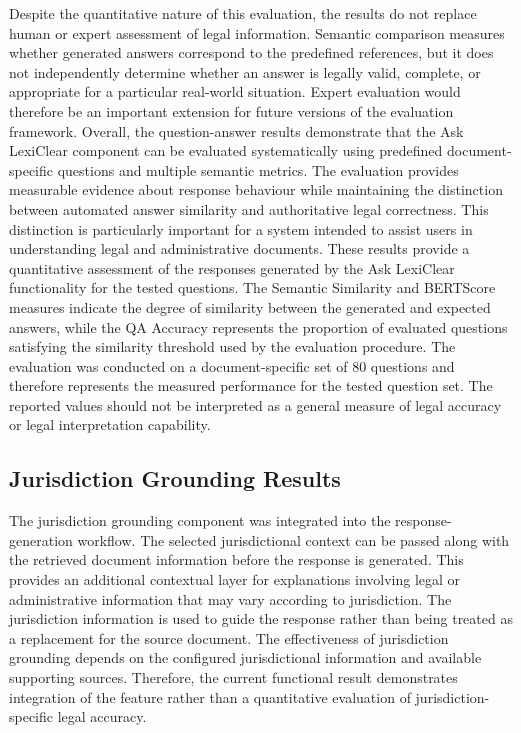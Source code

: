 \documentclass[12pt,a4paper,oneside]{report}
\begin{document}
Despite the quantitative nature of this evaluation, the results do not replace human or expert assessment of legal information. Semantic comparison measures whether generated answers correspond to the predefined references, but it does not independently determine whether an answer is legally valid, complete, or appropriate for a particular real-world situation. Expert evaluation would therefore be an important extension for future versions of the evaluation framework. Overall, the question-answer results demonstrate that the Ask LexiClear component can be evaluated systematically using predefined document-specific questions and multiple semantic metrics. The evaluation provides measurable evidence about response behaviour while maintaining the distinction between automated answer similarity and authoritative legal correctness. This distinction is particularly important for a system intended to assist users in understanding legal and administrative documents. These results provide a quantitative assessment of the responses generated by the Ask LexiClear functionality for the tested questions. The Semantic Similarity and BERTScore measures indicate the degree of similarity between the generated and expected answers, while the QA Accuracy represents the proportion of evaluated questions satisfying the similarity threshold used by the evaluation procedure. The evaluation was conducted on a document-specific set of 80 questions and therefore represents the measured performance for the tested question set. The reported values should not be interpreted as a general measure of legal accuracy or legal interpretation capability.





\subsection{Jurisdiction Grounding Results}
The jurisdiction grounding component was integrated into the response-generation workflow. The selected jurisdictional context can be passed along with the retrieved document information before the response is generated. This provides an additional contextual layer for explanations involving legal or administrative information that may vary according to jurisdiction. The jurisdiction information is used to guide the response rather than being treated as a replacement for the source document. The effectiveness of jurisdiction grounding depends on the configured jurisdictional information and available supporting sources. Therefore, the current functional result demonstrates integration of the feature rather than a quantitative evaluation of jurisdiction-specific legal accuracy.
\end{document}
